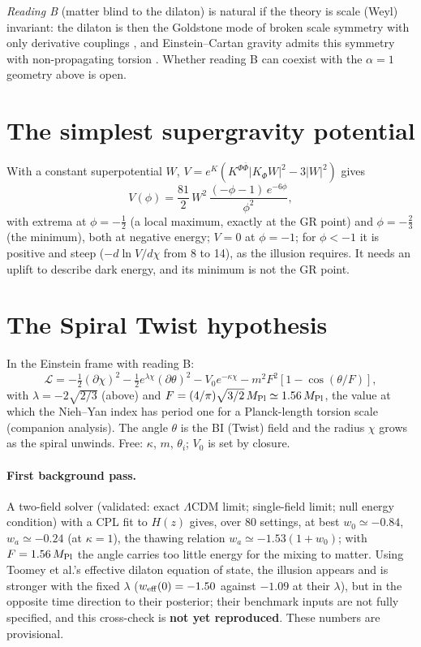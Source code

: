 \documentclass[11pt]{article}
\newcommand{\Mp}{M_{\rm Pl}}
\begin{document}
\emph{Reading B} (matter blind to the dilaton) is natural if the theory is scale (Weyl) invariant: the dilaton is
then the Goldstone mode of broken scale symmetry with only derivative couplings \cite{blas2011,ferreira2017}, and
Einstein--Cartan gravity admits this symmetry with non-propagating torsion \cite{karananas2021,piani2022}. Whether
reading B can coexist with the $\alpha=1$ geometry above is open.

\section{The simplest supergravity potential}
With a constant superpotential $W$, $V=e^K(K^{\Phi\bar\Phi}|K_\Phi W|^2-3|W|^2)$ gives
\begin{equation}
V(\phi)=\frac{81}{2}\,W^2\,\frac{(-\phi-1)\,e^{-6\phi}}{\phi^2},
\end{equation}
with extrema at $\phi=-\tfrac12$ (a local maximum, exactly at the GR point) and $\phi=-\tfrac23$ (the minimum),
both at negative energy; $V=0$ at $\phi=-1$; for $\phi<-1$ it is positive and steep
($-d\ln V/d\chi$ from 8 to 14), as the illusion requires. It needs an uplift to describe dark energy, and its minimum
is not the GR point.

\section{The Spiral Twist hypothesis}
In the Einstein frame with reading B:
\begin{equation}
\mathcal L=-\tfrac12(\partial\chi)^2-\tfrac12e^{\lambda\chi}(\partial\theta)^2-V_0e^{-\kappa\chi}
-m^2F^2\left[1-\cos(\theta/F)\right],
\end{equation}
with $\lambda=-2\sqrt{2/3}$ (above) and $F=(4/\pi)\sqrt{3/2}\,\Mp\simeq1.56\,\Mp$, the value at which the
Nieh--Yan index has period one for a Planck-length torsion scale (companion analysis). The angle $\theta$ is the BI
(Twist) field and the radius $\chi$ grows as the spiral unwinds. Free: $\kappa$, $m$, $\theta_i$; $V_0$ is set by
closure.

\paragraph{First background pass.} A two-field solver (validated: exact $\Lambda$CDM limit; single-field limit;
null energy condition) with a CPL fit to $H(z)$ gives, over 80 settings, at best $w_0\simeq-0.84$, $w_a\simeq-0.24$
(at $\kappa=1$), the thawing relation $w_a\simeq-1.53(1+w_0)$; with $F=1.56\,\Mp$ the angle carries too little
energy for the mixing to matter. Using Toomey et al.'s effective dilaton equation of state, the illusion appears and
is stronger with the fixed $\lambda$ ($w_{\rm eff}(0)=-1.50$ against $-1.09$ at their $\lambda$), but in the opposite
time direction to their posterior; their benchmark inputs are not fully specified, and this cross-check is
\textbf{not yet reproduced}. These numbers are provisional.
\end{document}
